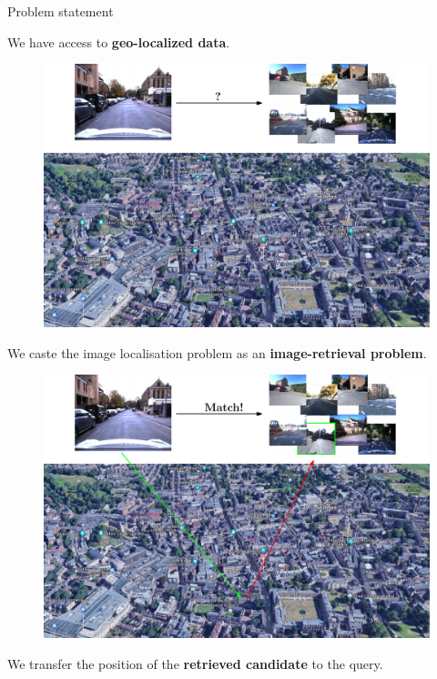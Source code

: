 \begin{frame}{Problem statement}
{\begin{minipage}{0.75\linewidth}
\begin{figure}
		\end{figure}		
	\end{minipage}
	\hfill
	\begin{minipage}{0.18\linewidth}
			We have access to \textbf{geo-localized data}.
	\end{minipage}
	}
	{
	\begin{minipage}{0.75\linewidth}
		\begin{figure}
			\includegraphics[width=\linewidth]{vect/intro/fig1/3}
		\end{figure}		
	\end{minipage}
	\hfill
	\begin{minipage}{0.18\linewidth}
		We caste the image localisation problem as an \textbf{image-retrieval problem}.
	\end{minipage}
	}
	{
	\begin{minipage}{0.75\linewidth}
		\begin{figure}
			\includegraphics[width=\linewidth]{vect/intro/fig1/4}
		\end{figure}		
	\end{minipage}
	\hfill
	\begin{minipage}{0.18\linewidth}
		We transfer the position of the \textbf{retrieved candidate} to the query.
	\end{minipage}
	}
\end{frame}

